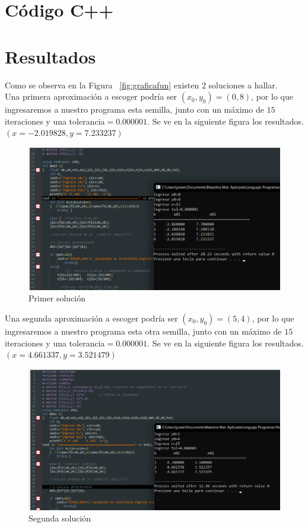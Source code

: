 \documentclass[10pt,a4paper]{article}
\begin{document}
\section{Código C++}




\section{Resultados}

Como se observa en la Figura ~\ref{fig:graficafun} existen 2 soluciones a hallar.\\

Una primera aproximación a escoger podría ser $(x_{0},y_{0})=(0,8)$, por lo que ingresaremos a nuestro programa esta semilla, junto con un máximo de $15$ iteraciones y una tolerancia$=0.000001$. Se ve en la siguiente figura los resultados. $(x=-2.019828,y=7.233237)$

\begin{figure}[h]
\centering
\includegraphics[scale=0.66]{resultado1}
\caption{Primer solución}
\end{figure}





Una segunda aproximación a escoger podría ser $(x_{0},y_{0})=(5,4)$, por lo que ingresaremos a nuestro programa esta otra semilla, junto con un máximo de $15$ iteraciones y una tolerancia$=0.000001$. Se ve en la siguiente figura los resultados. $(x=4.661337,y=3.521479)$

\begin{figure}[h]
\centering
\includegraphics[scale=0.66]{resultado2}
\caption{Segunda solución}
\end{figure}
\end{document}
